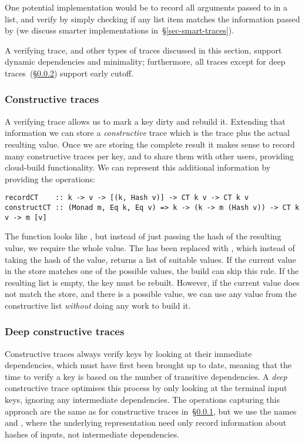 One potential implementation would be to record all arguments passed to
 in a list, and verify by simply checking if any list item matches
the information passed by  (we discuss smarter implementations
in~\S\ref{sec-smart-traces}).

A verifying trace, and other types of traces discussed in this section, support
dynamic dependencies and minimality; furthermore, all traces except for deep
traces~(\S\ref{sec-deep-constructive-traces}) support early cutoff.

\subsubsection{Constructive traces}\label{sec-constructive-traces}

A verifying trace allows us to mark a key dirty and rebuild it. Extending that
information we can store a \emph{constructive} trace which is the trace plus the
actual resulting value. Once we are storing the complete result it makes sense
to record many constructive traces per key, and to share them with other users,
providing cloud-build functionality. We can represent this additional
information by providing the operations:

\begin{verbatim}
recordCT    :: k -> v -> [(k, Hash v)] -> CT k v -> CT k v
constructCT :: (Monad m, Eq k, Eq v) => k -> (k -> m (Hash v)) -> CT k v -> m [v]
\end{verbatim}

\noindent
The function  looks like , but instead of just passing
the hash of the resulting value, we require the whole value. The 
has been replaced with , which instead of taking the hash of the
value, returns a list of suitable values. If the current value in the store
matches one of the possible values, the build can skip this rule. If the
resulting list is empty, the key must be rebuilt. However, if the current value
does not match the store, and there is a possible value, we can use any value
from the constructive list \emph{without} doing any work to build it.

\subsubsection{Deep constructive traces}\label{sec-deep-constructive-traces}

Constructive traces always verify keys by looking at their immediate
dependencies, which must have first been brought up to date, meaning that the
time to verify a key is based on the number of transitive dependencies. A
\emph{deep} constructive trace optimises this process by only looking at the
terminal input keys, ignoring any intermediate dependencies. The operations
capturing this approach are the same as for constructive traces
in~\S\ref{sec-constructive-traces}, but we use the names  and
, where the underlying  representation need only record
information about hashes of inputs, not intermediate dependencies.

